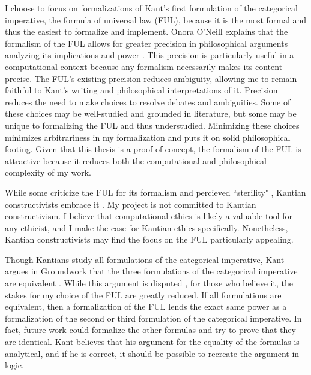 \begin{isabellebody}
\begin{isamarkuptext}
I choose to focus on formalizations of Kant's first formulation of the categorical imperative,
the formula of universal law (FUL), because it is the most formal and thus the easiest to formalize and implement. 
Onora O'Neill explains that the formalism of the FUL allows 
for greater precision in philosophical arguments analyzing its implications and power \cite[33]{actingonprinciple}. This precision 
is particularly useful in a computational context because any formalism necessarily makes its content 
precise. The FUL's existing precision reduces ambiguity, allowing me to remain faithful to Kant's writing and 
philosophical interpretations of it. Precision reduces the need to make choices to resolve debates 
and ambiguities. Some of these choices may be well-studied and grounded in literature, 
but some may be unique to formalizing the FUL and thus understudied. Minimizing these choices minimizes 
arbitrariness in my formalization and puts it on solid philosophical footing. Given that this thesis is a proof-of-concept, 
the formalism of the FUL is attractive because it reduces both the computational and philosophical complexity of my work. 

While some criticize the FUL for its formalism and percieved ``sterility" \cite[33]{actingonprinciple}, 
Kantian constructivists embrace it \cite[173]{ebelsduggan}. My project is not committed to Kantian constructivism. 
I believe that computational ethics is likely a valuable tool for any ethicist, and I make the case 
for Kantian ethics specifically. Nonetheless, Kantian constructivists may find the focus on 
the FUL particularly appealing. 

Though Kantians study all formulations of the categorical imperative, Kant argues in Groundwork 
that the three formulations of the categorical imperative are equivalent \cite{groundwork}. While this 
argument is disputed \cite{sepkant}, for those who believe it, the
stakes for my choice of the FUL are greatly reduced. If all formulations are equivalent, then a formalization of the FUL
lends the exact same power as a formalization of the second or third formulation of the categorical 
imperative. In fact, future work could formalize the other formulas and try to prove that they 
are identical. Kant believes that his argument for the equality of the formulas is analytical, and
if he is correct, it should be possible to recreate the argument in logic.


\end{isamarkuptext}
\end{isabellebody}
